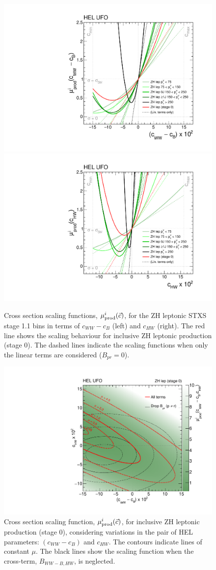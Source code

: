 \begin{figure}[htb!]
  \centering
  \includegraphics[width=.48\textwidth]{Figures/eft/scaling_functions/ZH_lep_vs_cWWMinuscB.pdf}
  \includegraphics[width=.48\textwidth]{Figures/eft/scaling_functions/ZH_lep_vs_cHW.pdf}
  \caption[HEL cross section scaling functions for ZH leptonic STXS stage 1.1 bins]
  {
    Cross section scaling functions, $\mu_{\rm{prod}}^i(\vec{c})$, for the ZH leptonic STXS stage 1.1 bins in terms of $c_{WW}-c_B$ (left) and $c_{HW}$ (right). The red line shows the scaling behaviour for inclusive ZH leptonic production (stage 0). The dashed lines indicate the scaling functions when only the linear terms are considered ($B_{pr}=0$).
  }
  \label{fig:zhlep_sf_1d}
\end{figure}

\begin{figure}[htb!]
  \centering
  \includegraphics[width=.7\textwidth]{Figures/eft/scaling_functions/ZH_lep_cWWMinuscB_vs_cHW.pdf}
  \caption[Two-dimensional HEL cross section scaling function for ZH lep STXS stage 0 bin]
  {
    Cross section scaling function, $\mu_{\rm{prod}}^i(\vec{c})$, for inclusive ZH leptonic production (stage 0), considering variations in the pair of HEL parameters: $(c_{WW}-c_B)$ and $c_{HW}$. The contours indicate lines of constant $\mu$. The black lines show the scaling function when the cross-term, $B_{WW-B,HW}$, is neglected.
  }
  \label{fig:zhlep_sf_2d}
\end{figure}

